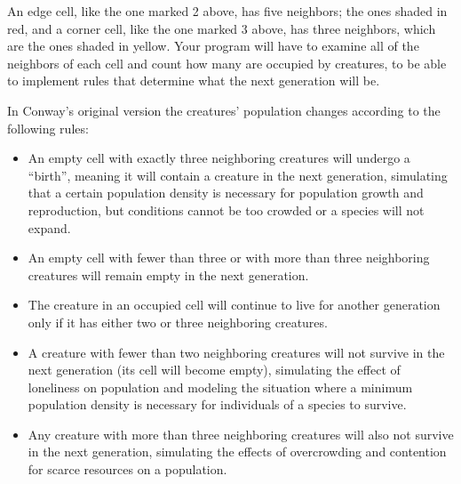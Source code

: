 \documentclass[11pt]{article}
\begin{document}
    \medskip

    An edge cell, like the one marked 2 above, has five neighbors; the ones
  shaded in red, and a corner cell, like the one marked 3 above, has three
  neighbors, which are the ones shaded in yellow.  Your program will have to
  examine all of the neighbors of each cell and count how many are occupied
  by creatures, to be able to implement rules that determine what the next
  generation will be.

    In Conway's original version the creatures' population changes according
  to the following rules:

    \vspace{-2.75mm}

    \begin{itemize}

      \addtolength{\itemsep}{-2mm}

      \item An empty cell with exactly three neighboring creatures will
            undergo a ``birth'', meaning it will contain a creature in the
            next generation, simulating that a certain population density is
            necessary for population growth and reproduction, but conditions
            cannot be too crowded or a species will not expand.

      \item An empty cell with fewer than three or with more than three
            neighboring creatures will remain empty in the next generation.

      \item The creature in an occupied cell will continue to live for
            another generation only if it has either two or three
            neighboring creatures.

      \item A creature with fewer than two neighboring creatures will not
            survive in the next generation (its cell will become empty),
            simulating the effect of loneliness on population and modeling
            the situation where a minimum population density is necessary
            for individuals of a species to survive.

      \item Any creature with more than three neighboring creatures will
            also not survive in the next generation, simulating the effects
            of overcrowding and contention for scarce resources on a
            population.

    \end{itemize}
\end{document}
